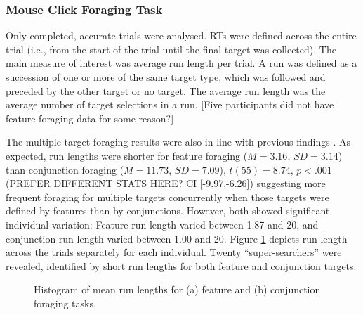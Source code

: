 \documentclass[]{rsos}%
\begin{document}
\subsubsection{Mouse Click Foraging Task}
 
Only completed, accurate trials were analysed. RTs were defined across the entire trial (i.e., from the start of the trial until the final target was collected). The main measure of interest was average run length per trial. A run was defined as a succession of one or more of the same target type, which was followed and preceded by the other target or no target. The average run length was the average number of target selections in a run. [Five participants did not have feature foraging data for some reason?]
 
The multiple-target foraging results were also in line with previous findings \cite{kristjansson2014,johannesson2016}. As expected, run lengths were shorter for feature foraging ($M = 3.16$, $SD = 3.14$) than conjunction foraging ($M = 11.73$, $SD = 7.09$), $t(55) = 8.74$, $p < .001$ (PREFER DIFFERENT STATS HERE? CI [-9.97,-6.26]) suggesting more frequent foraging for multiple targets concurrently when those targets were defined by features than by conjunctions. However, both showed significant individual variation: Feature run length varied between 1.87 and 20, and conjunction run length varied between 1.00 and 20. Figure \ref{fig:foraging_summary} depicts run length across the trials separately for each individual. Twenty ``super-searchers'' were revealed, identified by short run lengths for both feature and conjunction targets. 

\begin{figure}
\centering
{}
\caption{Histogram of mean run lengths for (a) feature and (b) conjunction foraging tasks.}
\label{fig:foraging_summary}
\end{figure}
\end{document}
